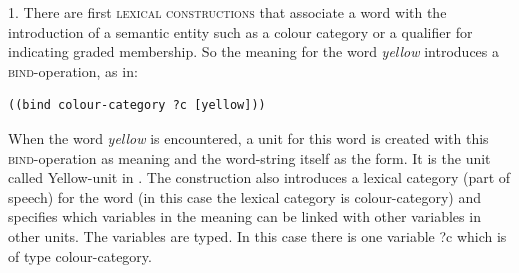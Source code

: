 1. There are first {\scshape lexical constructions} that associate a word with the introduction of a semantic entity  
such as a colour category or a qualifier for indicating graded membership. So the meaning for the word \textit{yellow} 
introduces a \textsc{bind}-operation, as in: 
\begin{verbatim}
((bind colour-category ?c [yellow]))
\end{verbatim}
When the word \textit{yellow} is encountered, a unit for this word is created with this \textsc{bind}-operation as meaning and the 
word-string itself as the form. It is the unit called Yellow-unit in . 
The construction also introduces a lexical category (part of speech) for the word (in this case the lexical category 
is colour-category) and specifies which variables in the meaning can be linked with other variables in other
units. The variables are typed. In this case there is one variable ?c which is of type colour-category. 

